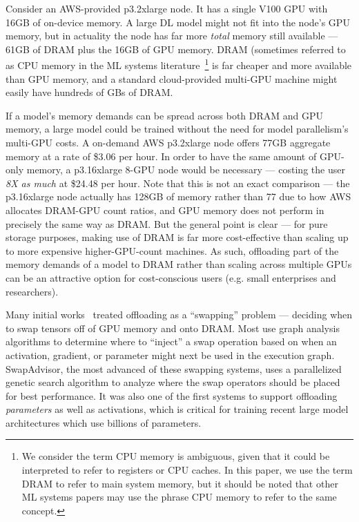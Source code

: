 Consider an AWS-provided p3.2xlarge node. It has a single V100 GPU with 16GB of on-device memory. A large DL model might not fit into the node's GPU memory, but in actuality the node has far more \textit{total} memory still available --- 61GB of DRAM plus the 16GB of GPU memory. DRAM (sometimes referred to as CPU memory in the ML systems literature~\footnote{We consider the term CPU memory is ambiguous, given that it could be interpreted to refer to registers or CPU caches. In this paper, we use the term DRAM to refer to main system memory, but it should be noted that other ML systems papers may use the phrase CPU memory to refer to the same concept.} is far cheaper and more available than GPU memory, and a standard cloud-provided multi-GPU machine might easily have hundreds of GBs of DRAM. 

If a model's memory demands can be spread across both DRAM and GPU memory, a large model could be trained without the need for model parallelism's multi-GPU costs. A on-demand AWS p3.2xlarge node offers 77GB aggregate memory at a rate of \$3.06 per hour. In order to have the same amount of GPU-only memory, a p3.16xlarge 8-GPU node would be necessary --- costing the user \textit{8X as much} at \$24.48 per hour.  Note that this is not an exact comparison --- the p3.16xlarge node actually has 128GB of memory rather than 77 due to how AWS allocates DRAM-GPU count ratios, and GPU memory does not perform in precisely the same way as DRAM. But the general point is clear --- for pure storage purposes, making use of DRAM is far more cost-effective than scaling up to more expensive higher-GPU-count machines. As such, offloading part of the memory demands of a model to DRAM rather than scaling across multiple GPUs can be an attractive option for cost-conscious users (e.g. small enterprises and researchers). 

Many initial works~\cite{tflms2019,meng2019,swapadvisor2021,vdnn2016,wang2018} treated offloading as a ``swapping'' problem --- deciding when to swap tensors off of GPU memory and onto DRAM. Most use graph analysis algorithms to determine where to ``inject'' a swap operation based on when an activation, gradient, or parameter might next be used in the execution graph. SwapAdvisor, the most advanced of these swapping systems, uses a parallelized genetic search algorithm to analyze where the swap operators should be placed for best performance. It was also one of the first systems to support offloading \textit{parameters} as well as activations, which is critical for training recent large model architectures which use billions of parameters.

